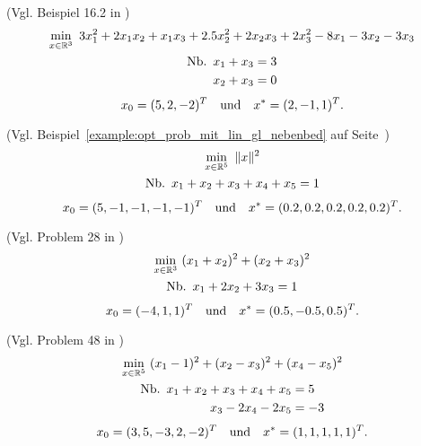 \begin{testproblem}
(Vgl. Beispiel 16.2 in \cite[S.~452]{nocedal})
\begin{gather}
\min_{x\in\R^3}\ 3 x_1^2 + 2 x_1 x_2 + x_1 x_3 + 2.5 x_2^2 + 2 x_2 x_3 + 2 x_3^2 - 8 x_1 - 3 x_2 - 3 x_3 \notag \\
\begin{split}
\nb x_1 + x_3 & = 3 \\
x_2 + x_3 & = 0 \\
\end{split}
\end{gather}
\begin{equation*}
x_0 = (5, 2, -2)^T \quad\text{und}\quad x^* = (2, -1, 1)^T.
\end{equation*}
\end{testproblem}

\begin{testproblem}
(Vgl. Beispiel~\ref{example:opt_prob_mit_lin_gl_nebenbed} auf Seite~\pageref{example:opt_prob_mit_lin_gl_nebenbed})
\begin{gather}
\min_{x\in\R^5}\ \| x \|^2 \notag \\
\begin{split}
\nb x_1 + x_2 + x_3 + x_4 + x_5 & = 1 \\
\end{split}
\end{gather}
\begin{equation*}
x_0 = (5, -1, -1, -1, -1)^T \quad\text{und}\quad x^* = (0.2, 0.2, 0.2, 0.2, 0.2)^T.
\end{equation*}
\end{testproblem}

\begin{testproblem}
(Vgl. Problem 28 in \cite[S.~51]{hock})
\begin{gather}
\min_{x\in\R^3}\ (x_1 + x_2)^2 + (x_2 + x_3)^2 \notag \\
\begin{split}
\nb x_1 + 2 x_2 + 3 x_3 & = 1 \\
\end{split}
\end{gather}
\begin{equation*}
x_0 = (-4, 1, 1)^T \quad\text{und}\quad x^* = (0.5, -0.5, 0.5)^T.
\end{equation*}
\end{testproblem}

\begin{testproblem}
(Vgl. Problem 48 in \cite[S.~71]{hock})
\begin{gather}
\min_{x\in\R^5}\ (x_1 - 1)^2 + (x_2 - x_3)^2 + (x_4 - x_5)^2 \notag \\
\begin{split}
\nb x_1 + x_2 + x_3 + x_4 + x_5 & = 5 \\
x_3 - 2 x_4 - 2 x_5 & = -3 \\
\end{split}
\end{gather}
\begin{equation*}
x_0 = (3, 5, -3, 2, -2)^T \quad\text{und}\quad x^* = (1, 1, 1, 1, 1)^T.
\end{equation*}
\end{testproblem}

